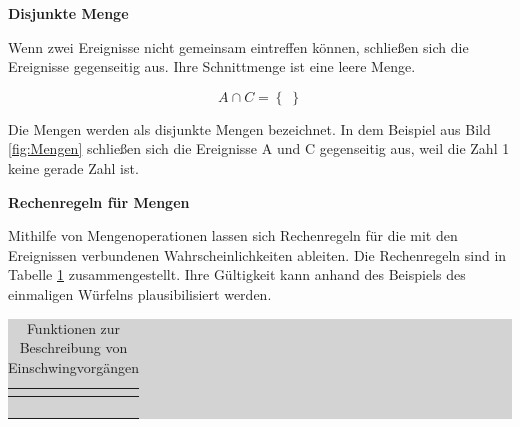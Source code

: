 {\selectfont
\noindent\textbf{Disjunkte Menge}} \smallskip

\noindent Wenn zwei Ereignisse nicht gemeinsam eintreffen k\"{o}nnen, schlie{\ss}en sich die Ereignisse gegenseitig aus. Ihre Schnittmenge ist eine leere Menge.

\begin{equation}\label{eq:twosixteen}
A\cap C=\left\{ \; \right\}
\end{equation}

\noindent Die Mengen werden als disjunkte Mengen bezeichnet. In dem Beispiel aus Bild \ref{fig:Mengen} schlie{\ss}en sich die Ereignisse A und C gegenseitig aus, weil die Zahl 1 keine gerade Zahl ist.\bigskip

{\selectfont
\noindent\textbf{Rechenregeln f\"{u}r Mengen}} \smallskip

\noindent Mithilfe von Mengenoperationen lassen sich Rechenregeln f\"{u}r die mit den Ereignissen verbundenen Wahrscheinlichkeiten ableiten. Die Rechenregeln sind in Tabelle \ref{tab:twoone} zusammengestellt. Ihre G\"{u}ltigkeit kann anhand des Beispiels des einmaligen W\"{u}rfelns plausibilisiert werden.

\begin{table}[H]
\setlength{\arrayrulewidth}{.1em}
\caption{Funktionen zur Beschreibung von Einschwingvorgängen}
\setlength{\fboxsep}{0pt}%
\colorbox{lightgray}{%
%
\begin{tabular}{| c | c |}
\hline
\parbox[c][0.28in][c]{3.3in}{\smallskip\centering\textbf{\selectfont{Gesetz}}} & 
\parbox[c][0.28in][c]{3.3in}{\smallskip\centering\textbf{\selectfont{Rechenoperation}}}\\ \hline

\parbox[c][0.4in][c]{3.3in}{} &
\parbox[c][0.4in][c]{3.3in}{}\\ \hline

\parbox[c][0.64in][c]{3.3in}{} & 
\parbox[c][0.64in][c]{3.3in}{}\\ \hline

\parbox[c][0.64in][c]{3.3in}{} & 
\parbox[c][0.64in][c]{3.3in}{}\\ \hline

\parbox[c][0.4in][c]{3.3in}{} &
\parbox[c][0.4in][c]{3.3in}{}\\ \hline

\end{tabular}%
}
\label{tab:twoone}
\end{table}

